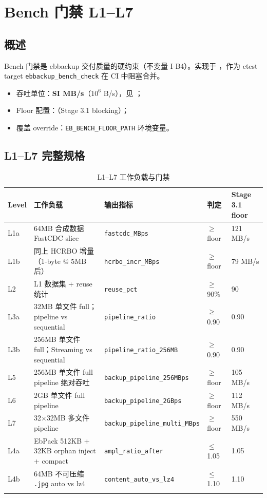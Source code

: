\chapter{Bench 门禁 L1--L7}
\label{ch:bench-gates}

\section{概述}

Bench 门禁是 ebbackup 交付质量的硬约束（不变量 I-B4）。实现于 ，作为 ctest target \texttt{ebbackup\_bench\_check} 在 CI 中阻塞合并。

\begin{itemize}[nosep]
  \item 吞吐单位：\textbf{SI MB/s}（$10^6$ B/s），见 ；
  \item Floor 配置：（Stage 3.1 blocking）；
  \item 覆盖 override：\texttt{EB\_BENCH\_FLOOR\_PATH} 环境变量。
\end{itemize}

\section{L1--L7 完整规格}

\begin{longtable}{@{}lllp{4.8cm}l@{}}
\toprule
Level & 工作负载 & 输出指标 & 判定 & Stage 3.1 floor \\
\midrule
\endhead
L1a & 64MB 合成数据 FastCDC slice & \texttt{fastcdc\_MBps} & $\geq$ floor & 121 MB/s \\
L1b & 同上 HCRBO 增量（1-byte @ 5MB 后） & \texttt{hcrbo\_incr\_MBps} & $\geq$ floor & 79 MB/s \\
L2 & L1 数据集 + reuse 统计 & \texttt{reuse\_pct} & $\geq$ 90\% & 90 \\
L3a & 32MB 单文件 full；pipeline vs sequential & \texttt{pipeline\_ratio} & $\geq$ 0.90 & 0.90 \\
L3b & 256MB 单文件 full；Streaming vs sequential & \texttt{pipeline\_ratio\_256MB} & $\geq$ 0.90 & 0.90 \\
L5 & 256MB 单文件 full pipeline 绝对吞吐 & \texttt{backup\_pipeline\_256MBps} & $\geq$ floor & 105 MB/s \\
L6 & 2GB 单文件 full pipeline & \texttt{backup\_pipeline\_2GBps} & $\geq$ floor & 112 MB/s \\
L7 & 32$\times$32MB 多文件 pipeline & \texttt{backup\_pipeline\_multi\_MBps} & $\geq$ floor & 550 MB/s \\
L4a & EbPack 512KB + 32KB orphan inject + compact & \texttt{ampl\_ratio\_after} & $\leq$ 1.05 & 1.05 \\
L4b & 64MB 不可压缩 \texttt{.jpg} auto vs lz4 & \texttt{content\_auto\_vs\_lz4} & $\leq$ 1.10 & 1.10 \\
\bottomrule
\caption{L1--L7 工作负载与门禁}
\end{longtable}


